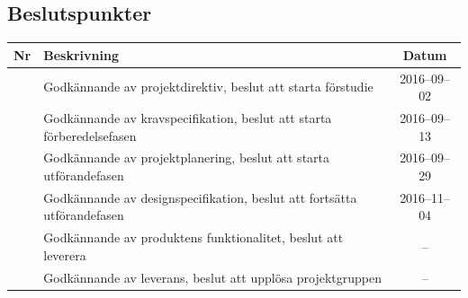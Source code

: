 \documentclass[a4paper,titlepage,12pt]{article}
\newcounter{bpNr}
\newcommand{\nextBPNr}{\stepcounter{bpNr}\arabic{bpNr}}
\begin{document}
	
	\subsection{Beslutspunkter}
	\renewcommand*{\arraystretch}{1.4}
    \begin{longtable}[c]{ c p{} c}
		\textbf{Nr} & \textbf{Beskrivning} & \textbf{Datum} \\ \midrule
		\nextBPNr{} & Godkännande av projektdirektiv, beslut att starta förstudie & 2016--09--02 \\ \midrule
		\nextBPNr{} & Godkännande av kravspecifikation, beslut att starta förberedelsefasen & 2016--09--13 \\ \midrule
		\nextBPNr{} & Godkännande av projektplanering, beslut att starta utförandefasen & 2016--09--29 \\ \midrule
		\nextBPNr{} & Godkännande av designspecifikation, beslut att fortsätta
		utförandefasen & 2016--11--04 \\ \midrule
		\nextBPNr{} & Godkännande av produktens funktionalitet, beslut att leverera & -- \\ \midrule
		\nextBPNr{} & Godkännande av leverans, beslut att upplösa projektgruppen & -- \\ \midrule
	\end{longtable}
	
    \newpage
	
\end{document}
